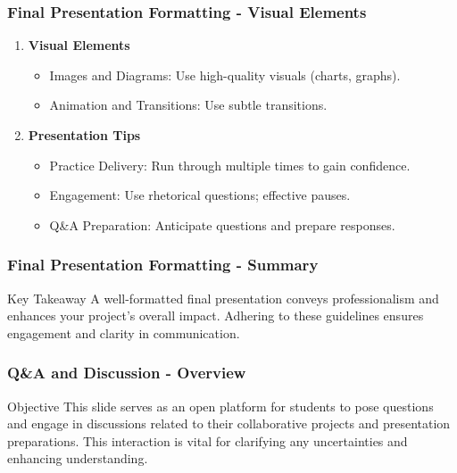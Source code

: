 \documentclass[aspectratio=169]{beamer}
\begin{document}
\begin{frame}[fragile]
    \frametitle{Final Presentation Formatting - Visual Elements}
    \begin{enumerate}[resume]
        \item \textbf{Visual Elements}
            \begin{itemize}
                \item Images and Diagrams: Use high-quality visuals (charts, graphs).
                \item Animation and Transitions: Use subtle transitions.
            \end{itemize}
        \item \textbf{Presentation Tips}
            \begin{itemize}
                \item Practice Delivery: Run through multiple times to gain confidence.
                \item Engagement: Use rhetorical questions; effective pauses.
                \item Q\&A Preparation: Anticipate questions and prepare responses.
            \end{itemize}
    \end{enumerate}
\end{frame}

\begin{frame}[fragile]
    \frametitle{Final Presentation Formatting - Summary}
    \begin{block}{Key Takeaway}
        A well-formatted final presentation conveys professionalism and enhances your project's overall impact. Adhering to these guidelines ensures engagement and clarity in communication.
    \end{block}
\end{frame}

\begin{frame}[fragile]
  \frametitle{Q\&A and Discussion - Overview}
  \begin{block}{Objective}
    This slide serves as an open platform for students to pose questions and engage in discussions related to their collaborative projects and presentation preparations. This interaction is vital for clarifying any uncertainties and enhancing understanding.
  \end{block}
\end{frame}
\end{document}
